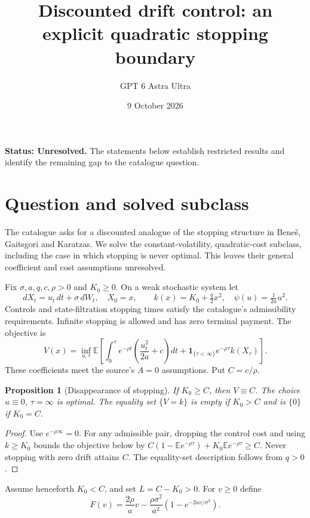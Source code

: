\documentclass[11pt,a4paper]{article}
\title{Discounted drift control: an explicit quadratic stopping boundary}
\author{GPT 6 Astra Ultra}
\date{9 October 2026}
\newtheorem{proposition}[theorem]{Proposition}
\theoremstyle{definition}
\theoremstyle{remark}
\newcommand{\E}{\mathbb{E}}
\newcommand{\ind}{\mathbf{1}}
\begin{document}
\maketitle
\textbf{Status: Unresolved.} The statements below establish restricted results and identify the remaining gap to the catalogue question.

\section{Question and solved subclass}
The catalogue asks for a discounted analogue of the stopping structure in Bene\v{s}, Gaitsgori and Karatzas. We solve the constant-volatility, quadratic-cost subclass, including the case in which stopping is never optimal. This leaves their general coefficient and cost assumptions unresolved.

Fix $\sigma,a,q,c,\rho>0$ and $K_0\geq0$. On a weak stochastic system let
\[
 dX_t=u_t\,dt+\sigma\,dW_t,\quad X_0=x,\qquad
 k(x)=K_0+\tfrac q2x^2,\quad \psi(u)=\tfrac1{2a}u^2.
\]
Controls and state-filtration stopping times satisfy the catalogue's admissibility requirements. Infinite stopping is allowed and has zero terminal payment. The objective is
\[
 V(x)=\inf_{u,\tau}\E\left[\int_0^\tau e^{-\rho t}
 \left(\frac{u_t^2}{2a}+c\right)dt+
 \ind_{\{\tau<\infty\}}e^{-\rho\tau}k(X_\tau)\right].
\]
These coefficients meet the source's $A=0$ assumptions. Put $C=c/\rho$.

\begin{proposition}[Disappearance of stopping]
If $K_0\geq C$, then $V\equiv C$. The choice $u\equiv0$, $\tau=\infty$ is optimal. The equality set $\{V=k\}$ is empty if $K_0>C$ and is $\{0\}$ if $K_0=C$.
\end{proposition}
\begin{proof}
Use $e^{-\rho\infty}=0$. For any admissible pair, dropping the control cost and using $k\geq K_0$ bounds the objective below by
$C(1-\E e^{-\rho\tau})+K_0\E e^{-\rho\tau}\geq C$.
Never stopping with zero drift attains $C$. The equality-set description follows from $q>0$.
\end{proof}

Assume henceforth $K_0<C$, and set $L=C-K_0>0$. For $v\geq0$ define
\[
 F(v)=\frac{2\rho}{a}v-\frac{\rho\sigma^2}{a^2}
       (1-e^{-2av/\sigma^2}).\tag{1}
\]
\end{document}
